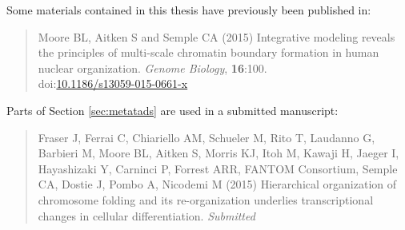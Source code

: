 \documentclass[a4paper,11pt,twoside,toc=listof]{scrbook}
\def\bf{\normalfont\bfseries}
\begin{document}
Some materials contained in this thesis have previously been published in:

\begin{quote}
Moore BL, Aitken S and Semple CA (2015) Integrative modeling reveals the principles of multi-scale chromatin boundary formation in human nuclear organization. \emph{Genome Biology}, {\bf 16}:100. \\ doi:\href{http://dx.doi.org/10.1186/s13059-015-0661-x}{10.1186/s13059-015-0661-x}
\end{quote} 

{\flushleft Parts of Section \ref{sec:metatads} are used in a submitted manuscript:}

\begin{quote}
Fraser J, Ferrai C, Chiariello AM, Schueler M, Rito T, Laudanno G, Barbieri M, Moore BL, Aitken S,
Morris KJ, Itoh M, Kawaji H, Jaeger I, Hayashizaki Y, Carninci P, Forrest ARR, FANTOM Consortium, Semple CA, Dostie J, Pombo A, Nicodemi M (2015) Hierarchical organization
of chromosome folding and its re-organization underlies transcriptional
changes in cellular differentiation. \emph{Submitted}
\end{quote}

\clearpage

\mainmatter











%





\backmatter




\end{document}
